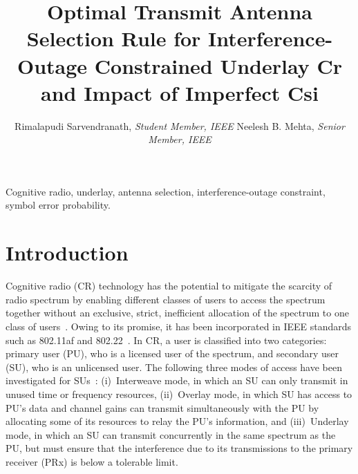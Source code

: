 \documentclass[12pt,draftcls,peerreview,onecolumn]{IEEEtran}
\begin{document}
\title{Optimal Transmit Antenna Selection Rule for Interference-Outage Constrained Underlay Cr and Impact
	of Imperfect Csi}
\author{Rimalapudi Sarvendranath, {\it Student Member, IEEE} Neelesh B. Mehta, {\it Senior Member, IEEE}}


\maketitle

\begin{abstract}

\end{abstract}


\begin{IEEEkeywords}
Cognitive radio, underlay, antenna selection, interference-outage constraint, symbol error probability.
\end{IEEEkeywords}




\section{Introduction}
\label{sec:intro}

Cognitive radio (CR) technology has the potential to mitigate the scarcity of radio spectrum by enabling different classes of users to access the spectrum together without an exclusive, strict, inefficient allocation of the spectrum to one class of users~\cite{Haykin_2005_TSAC,vu_2009_TWC}. Owing to its promise, it has been incorporated in IEEE standards such as 802.11af and 802.22~\cite{Sherman_2008_TCMAG}. In CR, a user is classified into two categories: primary user (PU), who is a licensed user of the spectrum, and secondary user (SU), who is an unlicensed user. The following three modes of access have been investigated for SUs~\cite{Goldsmith_2009_PIEEE,Sboui_2013_TWC,RZhang_2009_TWC,XKang_2011_JSAC}: (i)~Interweave mode, in which an SU can only transmit in unused time or frequency resources, (ii)~Overlay mode, in which SU has access to PU's data and channel gains can transmit simultaneously with the PU by allocating some of its resources to relay the PU's information, and (iii)~Underlay mode, in which an SU can transmit concurrently in the same spectrum as the PU, but must ensure that the interference due to its transmissions to the primary receiver (PRx) is below a tolerable limit. 
\end{document}

